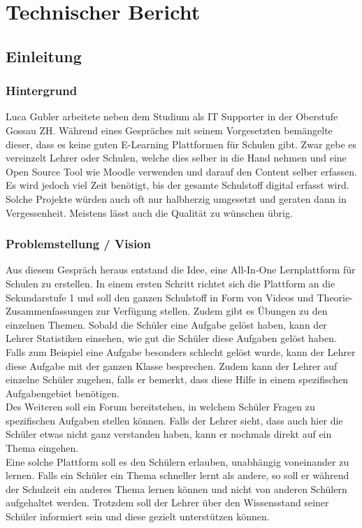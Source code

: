 \section{Technischer Bericht}
\subsection{Einleitung}

\subsubsection{Hintergrund}
Luca Gubler arbeitete neben dem Studium als IT Supporter in der Oberstufe Gossau ZH. Während eines Gespräches mit seinem Vorgesetzten bemängelte dieser, dass es keine guten E-Learning Plattformen für Schulen gibt. Zwar gebe es vereinzelt Lehrer oder Schulen, welche dies selber in die Hand nehmen und eine Open Source Tool wie Moodle verwenden und darauf den Content selber erfassen. Es wird jedoch viel Zeit benötigt, bis der gesamte Schulstoff digital erfasst wird. Solche Projekte würden auch oft nur halbherzig umgesetzt und geraten dann in Vergessenheit. Meistens lässt auch die Qualität zu wünschen übrig.

\subsubsection{Problemstellung / Vision}
Aus diesem Gespräch heraus entstand die Idee, eine All-In-One Lernplattform für Schulen zu erstellen. In einem ersten Schritt richtet sich die Plattform an die Sekundarstufe 1 und soll den ganzen Schulstoff in Form von Videos und Theorie-Zusammenfassungen zur Verfügung stellen. Zudem gibt es Übungen zu den einzelnen Themen. Sobald die Schüler eine Aufgabe gelöst haben, kann der Lehrer Statistiken einsehen, wie gut die Schüler diese Aufgaben gelöst haben. Falls zum Beispiel eine Aufgabe besonders schlecht gelöst wurde, kann der Lehrer diese Aufgabe mit der ganzen Klasse besprechen. Zudem kann der Lehrer auf einzelne Schüler zugehen, falls er bemerkt, dass diese Hilfe in einem spezifischen Aufgabengebiet benötigen. \\

Des Weiteren soll ein Forum bereitstehen, in welchem Schüler Fragen zu spezifischen Aufgaben stellen können. Falls der Lehrer sieht, dass auch hier die Schüler etwas nicht ganz verstanden haben, kann er nochmals direkt auf ein Thema eingehen. \\

Eine solche Plattform soll es den Schülern erlauben, unabhängig voneinander zu lernen. Falls ein Schüler ein Thema schneller lernt als andere, so soll er während der Schulzeit ein anderes Thema lernen können und nicht von anderen Schülern aufgehaltet werden. Trotzdem soll der Lehrer über den Wissensstand seiner Schüler informiert sein und diese gezielt unterstützen können.

